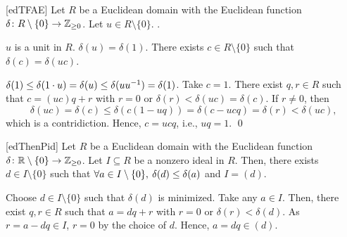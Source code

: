 \documentclass[../modern_algebra_2.tex]{subfiles}
\begin{document}
\begin{Theorem}{}[edTFAE]
    Let \(R\) be a Euclidean domain with the Euclidean function \(\delta \colon R \setminus \{0\}
    \to \ZZ_{\ge 0}\). Let \(u \in R \setminus \{0\}\). \TFAE.
    \begin{enumerate}[label=(\roman*)]
        \ii \(u\) is a unit in \(R\).
        \ii \(\delta(u) = \delta(1)\).
        \ii There exists \(c \in R \setminus \{0\}\) such that \(\delta(c) = \delta(uc)\).
    \end{enumerate}
\end{Theorem}
\begin{myclaim}[Proof]\hfill
\begin{pftfae}[labelwidth=\widthof{\(\text{(ii)} \Rightarrow \text{(iii)}\)}]
    \(\delta(1) \le \delta(1 \cdot u) = \delta(u) \le \delta(u u^{-1}) = \delta(1)\).
    Take \(c = 1\).
    There exist \(q, r \in R\) such that \(c = (uc)q + r\) with \(r = 0\) or \(\delta(r) <
    \delta(uc) = \delta(c)\). If \(r \neq 0\), then
    \[
        \delta(uc) = \delta(c) \le \delta(c(1 - uq)) = \delta(c - ucq) = \delta(r) < \delta(uc)\text{,}
    \]
    which is a contridiction.
    Hence, \(c = ucq\), i.e., \(uq = 1\).
    \qed
\end{pftfae}
\end{myclaim}

\begin{Theorem}{}[edThenPid]
    Let \(R\) be a Euclidean domain with the Euclidean function \(\delta \colon \RR \setminus \{0\}
    \to \ZZ_{\ge 0}\). Let \(I \subseteq R\) be a nonzero ideal in \(R\).
    Then, there exists \(d \in I \setminus \{0\}\) such that \(\forall a \in I \setminus \{0\},\: \delta(d) \le
    \delta(a)\) and \(I = (d)\).
\end{Theorem}
\begin{myproof}[Proof]
    Choose \(d \in I \setminus \{0\}\) such that \(\delta(d)\) is minimized.
    Take any \(a \in I\).
    Then, there exist \(q, r \in R\) such that \(a = dq + r\) with \(r = 0\) or \(\delta(r) <
    \delta(d)\). As \(r = a - dq \in I\), \(r = 0\) by the choice of \(d\).
    Hence, \(a = dq \in (d)\).
\end{myproof}
\end{document}
